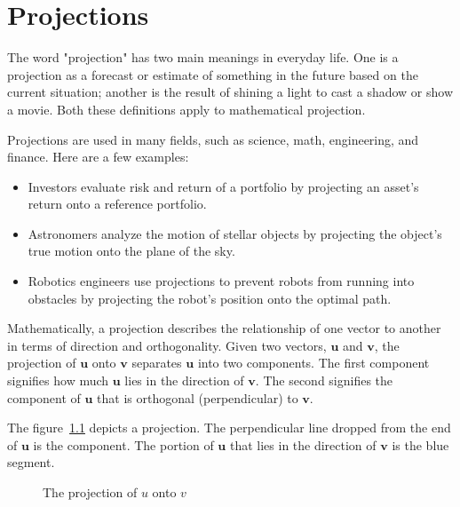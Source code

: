 \chapter{Projections}

The word "projection" has two main meanings in everyday life. One is a projection as a forecast or estimate of something in the future based on the current situation; another is the result of shining a light to cast a shadow or show a movie. Both these definitions apply to mathematical projection.

Projections are used in many fields, such as science, math, engineering, and finance. Here are a few examples: 
\begin{itemize}
\item Investors evaluate risk and return of a portfolio by projecting an asset’s return onto a reference portfolio.
\item Astronomers analyze the motion of stellar objects by projecting the object’s true motion onto the plane of the sky.
\item Robotics engineers use projections to prevent robots from running into obstacles by projecting the robot’s position onto the optimal path.
\end{itemize}

Mathematically, a projection describes the relationship of one vector to another in terms of direction and orthogonality. Given two vectors, $\mathbf{u}$ and $\mathbf{v}$, the projection of $\mathbf{u}$ onto $\mathbf{v}$ separates $\mathbf{u}$ into two components. The first component signifies how much $\mathbf{u}$ lies in the direction of $\mathbf{v}$. The second signifies the component of $\mathbf{u}$ that is orthogonal (perpendicular) to $\mathbf{v}$.  

The figure~\ref{fig:projection} depicts a projection. The perpendicular line dropped from the end of $\mathbf{u}$ is the  component. The portion of $\mathbf{u}$ that lies in the direction of $\mathbf{v}$ is the blue segment. 
\begin{figure}[htbp]
    \centering
    \caption{The projection of $u$ onto $v$}
    \label{fig:projection}
\end{figure}

